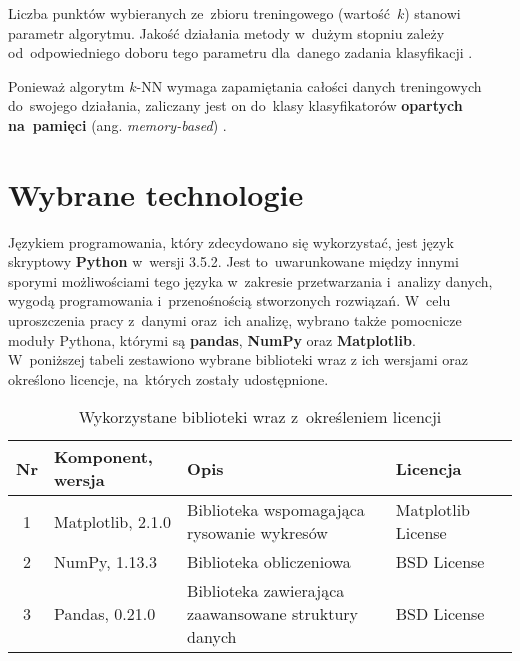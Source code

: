 \documentclass[11pt,a4paper]{article}
\begin{document}
Liczba punktów wybieranych ze~zbioru treningowego (wartość~$k$) stanowi parametr algorytmu.
Jakość działania metody w~dużym stopniu zależy od~odpowiedniego doboru tego parametru dla~danego zadania klasyfikacji \cite[s.~468--470]{hastie2009}.

Ponieważ algorytm $k$-NN wymaga zapamiętania całości danych treningowych do~swojego działania, zaliczany jest on do~klasy klasyfikatorów \textbf{opartych na~pamięci} (ang. \emph{memory-based}) \cite[s.~463]{hastie2009}.

\section{Wybrane technologie}
Językiem programowania, który zdecydowano się wykorzystać, jest język skryptowy \textbf{Python} w~wersji 3.5.2.
Jest to~uwarunkowane między innymi sporymi możliwościami tego języka w~zakresie przetwarzania i~analizy danych, wygodą programowania i~przenośnością stworzonych rozwiązań.
W~celu uproszczenia pracy z~danymi oraz~ich analizę, wybrano także pomocnicze moduły Pythona, którymi są \textbf{pandas}, \textbf{NumPy} oraz \textbf{Matplotlib}.\\

\noindent
W~poniższej tabeli zestawiono wybrane biblioteki wraz z ich wersjami oraz określono licencje, na~których zostały udostępnione.
\begin{table}[H]
    \begin{tabularx}{\textwidth}{|c|l|X|l|c|}
        \hline
        \textbf{Nr} & \textbf{Komponent, wersja} & \textbf{Opis} & \textbf{Licencja} & \\
        \hline
        \hline
        1 & 
        Matplotlib, 2.1.0 & 
        Biblioteka wspomagająca rysowanie wykresów &
        Matplotlib License &
        \cite{matplotlib} \\
        \hline
        2 & 
        NumPy, 1.13.3 &
        Biblioteka obliczeniowa &
        BSD License &
        \cite{numpy} \\
        \hline
        3 &
        Pandas, 0.21.0 &
        Biblioteka zawierająca zaawansowane struktury danych &
        BSD License &
        \cite{pandas} \\
        \hline
    \end{tabularx}
    \caption{Wykorzystane biblioteki wraz z~określeniem licencji}
\end{table}
\end{document}
